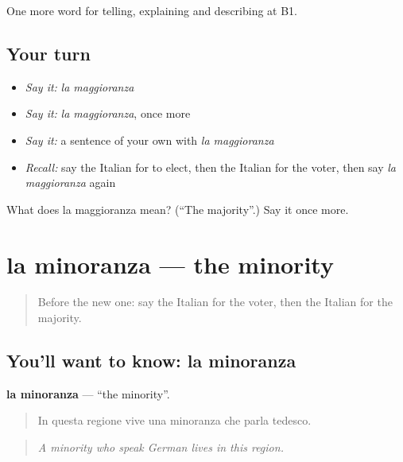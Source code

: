 \begin{grammarlens}[title={What you've built}]
One more word for telling, explaining and describing at B1.
\end{grammarlens}

\subsection*{Your turn}
\begin{itemize}
\raggedright
  \item \emph{Say it:} \emph{la maggioranza}
  \item \emph{Say it:} \emph{la maggioranza}, once more
  \item \emph{Say it:} a sentence of your own with \emph{la maggioranza}
  \item \emph{Recall:} say the Italian for to elect, then the Italian for the voter, then say \emph{la maggioranza} again
\end{itemize}

\begin{tcolorbox}[breakable,colback=teal!4,colframe=teal!35!black,title={Before you move on}]
What does la maggioranza mean? (\textquotedblleft{}The majority\textquotedblright{}.) Say it once more.
\end{tcolorbox}
\section[la minoranza]{la minoranza — the minority}

\label{lesson:IT-C370-minoranza}



\begin{quote}
Before the new one: say the Italian for the voter, then the Italian for the majority.
\end{quote}

\subsection*{You'll want to know: la minoranza}
\textbf{la minoranza} — \textquotedblleft{}the minority\textquotedblright{}.

\begin{quote}
In questa regione vive una minoranza che parla tedesco.
\end{quote}

\begin{quote}
\emph{A minority who speak German lives in this region.}
\end{quote}

